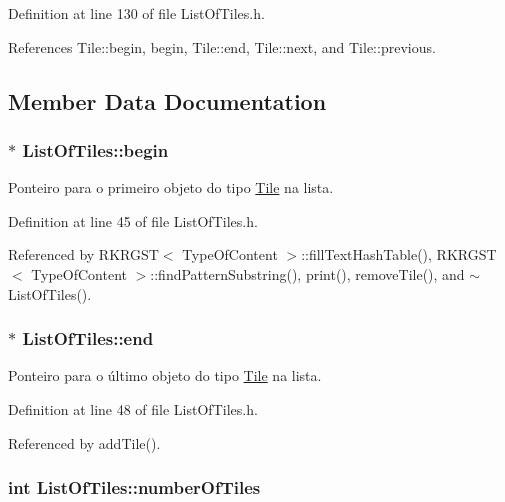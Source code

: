 Definition at line 130 of file List\+Of\+Tiles.\+h.



References Tile\+::begin, begin, Tile\+::end, Tile\+::next, and Tile\+::previous.



\subsection{Member Data Documentation}
\hypertarget{classListOfTiles_a19f2f2aac9802594a1080a199fa5b3b7}{
\subsubsection[{begin}]{$\ast$ List\+Of\+Tiles\+::begin}}\label{classListOfTiles_a19f2f2aac9802594a1080a199fa5b3b7}


Ponteiro para o primeiro objeto do tipo \hyperlink{classTile}{Tile} na lista. 



Definition at line 45 of file List\+Of\+Tiles.\+h.



Referenced by R\+K\+R\+G\+S\+T$<$ Type\+Of\+Content $>$\+::fill\+Text\+Hash\+Table(), R\+K\+R\+G\+S\+T$<$ Type\+Of\+Content $>$\+::find\+Pattern\+Substring(), print(), remove\+Tile(), and $\sim$\+List\+Of\+Tiles().

\hypertarget{classListOfTiles_adebd46c83a63f0e0f385cc0170def3b3}{
\subsubsection[{end}]{$\ast$ List\+Of\+Tiles\+::end}}\label{classListOfTiles_adebd46c83a63f0e0f385cc0170def3b3}


Ponteiro para o último objeto do tipo \hyperlink{classTile}{Tile} na lista. 



Definition at line 48 of file List\+Of\+Tiles.\+h.



Referenced by add\+Tile().

\hypertarget{classListOfTiles_a6d6a5a454a10f1a9ea1fd4bc4dedf290}{
\subsubsection[{number\+Of\+Tiles}]{\setlength{\rightskip}{0pt plus 5cm}int List\+Of\+Tiles\+::number\+Of\+Tiles}}\label{classListOfTiles_a6d6a5a454a10f1a9ea1fd4bc4dedf290}


